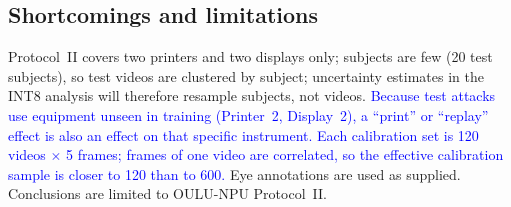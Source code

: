 \documentclass[conference]{IEEEtran}
\newcommand{\scope}[1]{\textcolor{blue}{#1}}
\begin{document}
\subsection{Shortcomings and limitations}
Protocol~II covers two printers and two displays only; subjects are few (20 test subjects), so test videos are
clustered by subject; uncertainty estimates in the INT8 analysis will therefore resample subjects, not videos. \scope{Because test attacks use
equipment unseen in training (Printer~2, Display~2), a ``print'' or ``replay'' effect is also an effect on that
specific instrument. Each calibration set is 120 videos $\times$ 5 frames; frames of one video are correlated, so
the effective calibration sample is closer to 120 than to 600.} Eye annotations are used as supplied. Conclusions are limited to OULU-NPU Protocol~II.

\end{document}
